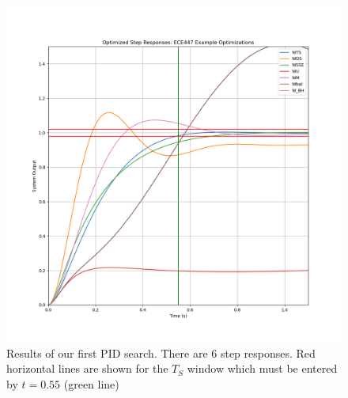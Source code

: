 \begin{figure}\centering
  \includegraphics[width=4.5in]{figs10/S43Q01.png}
  \caption{Results of our first PID search.   There are 6 step responses.
  Red horizontal lines are shown for the $T_S$ window which must be entered by
  $t=0.55$ (green line)}\label{PIDsearchV1x5}
\end{figure}

